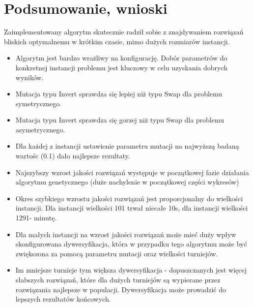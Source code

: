 \documentclass[a4paper,11pt]{article}
\begin{document}
\newpage
\section{Podsumowanie, wnioski}

Zaimplementowany algorytm skutecznie radził sobie z znajdywaniem rozwiązań bliskich optymalnemu w krótkim czasie, mimo dużych rozmiarów instancji. 

\begin{itemize}
\item Algorytm jest bardzo wrażliwy na konfigurację. Dobór parametrów do konkretnej instancji problemu jest kluczowy w celu uzyskania dobrych wyników.
\item Mutacja typu Invert sprawdza się lepiej niż typu Swap dla problemu symetrycznego.
\item Mutacja typu Invert sprawdza się gorzej niż typu Swap dla problemu asymetrycznego.
\item Dla każdej z instancji ustawienie parametru mutacji na najwyższą badaną wartośc (0.1) dało najlepsze rezultaty.
\item Najszybszy wzrost jakości rozwiązań występuje w początkowej fazie działania algorytmu genetycznego (duże nachylenie w początkowej części wykresów)
\item Okres szybkiego wzrostu jakości rozwiązań jest proporcjonalny do wielkości instancji. Dla instancji wielkości 101 trwał niecałe 10s, dla instancji wielkości 1291-  minutę.
\item Dla małych instancji na wzrost jakości rozwiązań może mieć duży wpływ skonfigurowana dywersyfikacja, która w przypadku tego algorytmu może być zwiększona za pomocą parametru mutacji oraz wielkości turniejów.
\item Im mniejsze turnieje tym większa dywersyfikacja - dopuszczanych jest więcej słabszych rozwiązań, które dla dużych turniejów są wypierane przez rozwiązania najlepsze w populacji. Dywersyfikacja może prowadzić do lepszych rezultatów końcowych.

\end{itemize}
\end{document}
